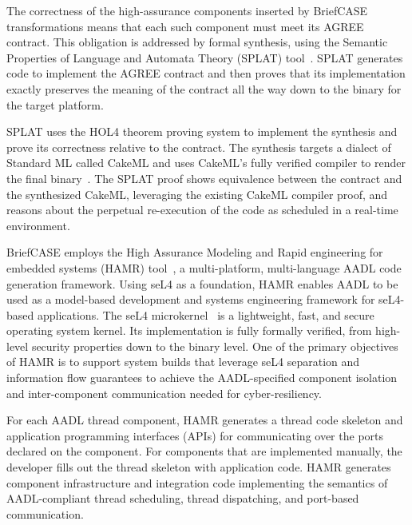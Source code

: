 The correctness of the high-assurance components inserted by BriefCASE transformations means that each such component must meet its AGREE contract. This obligation is addressed by formal synthesis, using the Semantic Properties of Language and Automata Theory (SPLAT) tool~\cite{case-models-2021}. SPLAT generates code to implement the AGREE contract and then proves that its implementation exactly preserves the meaning of the contract all the way down to the binary for the target platform.

SPLAT uses the HOL4 theorem proving system to implement the synthesis and prove its correctness relative to the contract. The synthesis targets a dialect of Standard ML called CakeML and uses CakeML’s fully verified compiler to render the final binary~\cite{cakeml}. 
The SPLAT proof shows equivalence between the contract and the synthesized CakeML, leveraging the existing CakeML compiler proof, and reasons about the perpetual re-execution of the code as scheduled in a real-time environment.

BriefCASE employs the High Assurance Modeling and Rapid engineering for embedded systems (HAMR) tool~\cite{hamr}, a multi-platform, multi-language AADL code generation framework. 
Using seL4 as a foundation, HAMR enables AADL to be used as a model-based development and systems engineering framework for seL4-based applications. 
%
The seL4 microkernel~\cite{sel4-sosp09} is a lightweight, fast, and secure operating system kernel. Its implementation is fully formally verified, from high-level security properties down to the binary level.
%
One of the primary objectives of HAMR is to support system builds that leverage seL4 separation and information flow guarantees to achieve the AADL-specified component isolation and inter-component communication needed for cyber-resiliency. 

For each AADL thread component, HAMR generates a thread code skeleton and application programming interfaces (APIs) for communicating over the ports declared on the component. For components that are implemented manually, the developer fills out the thread skeleton with application code. 
%
HAMR generates component infrastructure and integration code implementing the semantics of AADL-compliant thread scheduling, thread dispatching, and port-based communication. 

